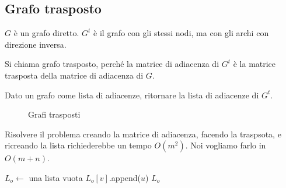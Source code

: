 \clearpage

\subsection{Grafo trasposto}

\begin{esercizio}
$G$ \`e un grafo diretto. $G^t$ \`e il grafo con gli stessi nodi, ma con gli archi con direzione inversa.

Si chiama grafo trasposto, perch\'e la matrice di adiacenza di $G^t$ \`e la matrice trasposta della matrice di adiacenza di $G$.

Dato un grafo come lista di adiacenze, ritornare la lista di adiacenze di $G^t$.
\end{esercizio}

\begin{figure}
\centering
{}
\caption{Grafi trasposti}
\end{figure}

Risolvere il problema creando la matrice di adiacenza, facendo la traspsota, e ricreando la lista richiederebbe un tempo $O(m^2)$. Noi vogliamo farlo in $O(m + n)$.

\begin{algorithm}
\caption{Algoritmo per trasporre un grafo}
\begin{algorithmic}[1]
    \State $L_o \gets$ una lista vuota
            \State $L_o[v]$.append($u$)
        \EndFor
    \EndFor
    \State \Return $L_o$
\EndFunction
\end{algorithmic}
\end{algorithm}

